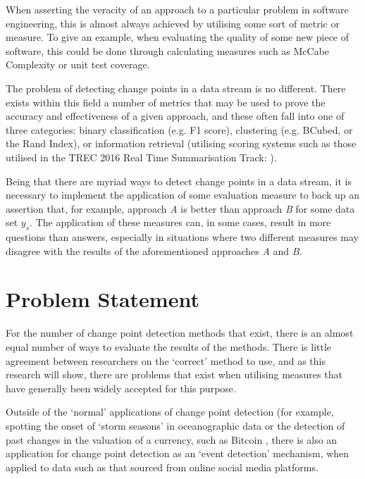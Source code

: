 \documentclass[../main.tex]{subfiles}
\begin{document}
When asserting the veracity of an approach to a particular problem in software engineering, this is almost always achieved by utilising some sort of metric or measure. To give an example, when evaluating the quality of some new piece of software, this could be done through calculating measures such as McCabe Complexity \cite{ThomasJ.McCabe1976} or unit test coverage.

The problem of detecting change points in a data stream is no different. There exists within this field a number of metrics that may be used to prove the accuracy and effectiveness of a given approach, and these often fall into one of three categories: binary classification (e.g. F1 score), clustering (e.g. BCubed, or the Rand Index), or information retrieval (utilising scoring systems such as those utilised in the TREC 2016 Real Time Summarisation Track: \cite{trec2016}).

Being that there are myriad ways to detect change points in a data stream, it is necessary to implement the application of some evaluation measure to back up an assertion that, for example, approach \emph{A} is better than approach \emph{B} for some data set $y_s$. The application of these measures can, in some cases, result in more questions than answers, especially in situations where two different measures may disagree with the results of the aforementioned approaches \emph{A} and \emph{B}.

\section{Problem Statement}
\label{Problem Statement}

For the number of change point detection methods that exist, there is an almost equal number of ways to evaluate the results of the methods. There is little agreement between researchers on the `correct' method to use, and as this research will show, there are problems that exist when utilising measures that have generally been widely accepted for this purpose.

Outside of the `normal' applications of change point detection (for example, spotting the onset of `storm seasons' in oceanographic data \cite{Killick2011} or the detection of past changes in the valuation of a currency, such as Bitcoin \cite{Buntain2014}, there is also an application for change point detection as an `event detection' mechanism, when applied to data such as that sourced from online social media platforms.
\end{document}
